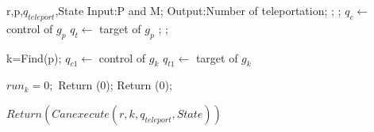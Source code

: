 \begin{algorithm}
{
\fontsize{9}{1}
\caption{The algorithm converts quantum circuit to bigraph}
\begin{algorithmic}[1]

 {r,p,$q_{teleport}$,State}    
 \State Input:P and M;
 \State Output:Number of teleportation;
      ;
       ;
   \EndIf              
 \State $q_{c} \leftarrow$ control of  $g_{p}$
 \State $q_{t} \leftarrow$ target of  $g_{p}$  
     ;
       ;
   \EndIf      
  
 \State k=Find(p); 
  \State $q_{c1} \leftarrow$ control of $g_{k}$
 \State $q_{t1} \leftarrow$ target of  $g_{k}$  
 
    \State $run_{k}=0;$  
    \State Return (0);  
 \EndIf
         \State Return (0);
    \EndIf

      \State $Return(Canexecute(r,k,q_{teleport},State))$
      \EndIf
\EndFunction
\end{algorithmic}
}
\end{algorithm}